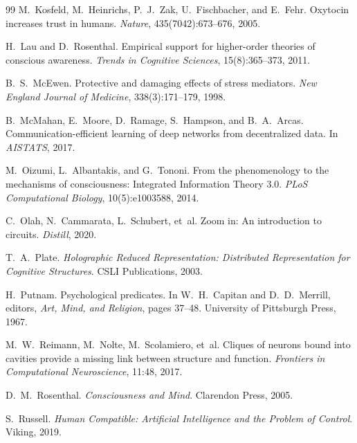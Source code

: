 \documentclass[12pt]{book}
\begin{document}
\begin{thebibliography}{99}
M.~Kosfeld, M.~Heinrichs, P.~J.~Zak, U.~Fischbacher, and E.~Fehr.
\newblock Oxytocin increases trust in humans.
\newblock \textit{Nature}, 435(7042):673--676, 2005.

H.~Lau and D.~Rosenthal.
\newblock Empirical support for higher-order theories of conscious awareness.
\newblock \textit{Trends in Cognitive Sciences}, 15(8):365--373, 2011.

B.~S.~McEwen.
\newblock Protective and damaging effects of stress mediators.
\newblock \textit{New England Journal of Medicine}, 338(3):171--179, 1998.

B.~McMahan, E.~Moore, D.~Ramage, S.~Hampson, and B.~A.~Arcas.
\newblock Communication-efficient learning of deep networks from decentralized data.
\newblock In \textit{AISTATS}, 2017.

M.~Oizumi, L.~Albantakis, and G.~Tononi.
\newblock From the phenomenology to the mechanisms of consciousness: Integrated Information Theory 3.0.
\newblock \textit{PLoS Computational Biology}, 10(5):e1003588, 2014.

C.~Olah, N.~Cammarata, L.~Schubert, et~al.
\newblock Zoom in: An introduction to circuits.
\newblock \textit{Distill}, 2020.

T.~A.~Plate.
\newblock \textit{Holographic Reduced Representation: Distributed Representation for Cognitive Structures}.
\newblock CSLI Publications, 2003.

H.~Putnam.
\newblock Psychological predicates.
\newblock In W.~H.~Capitan and D.~D.~Merrill, editors, \textit{Art, Mind, and Religion}, pages 37--48. University of Pittsburgh Press, 1967.

M.~W.~Reimann, M.~Nolte, M.~Scolamiero, et~al.
\newblock Cliques of neurons bound into cavities provide a missing link between structure and function.
\newblock \textit{Frontiers in Computational Neuroscience}, 11:48, 2017.

D.~M.~Rosenthal.
\newblock \textit{Consciousness and Mind}.
\newblock Clarendon Press, 2005.

S.~Russell.
\newblock \textit{Human Compatible: Artificial Intelligence and the Problem of Control}.
\newblock Viking, 2019.


\end{thebibliography}
\end{document}
